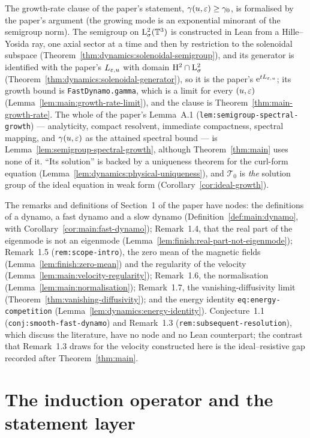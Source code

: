 The growth-rate clause of the paper's statement, $\gamma(u,\varepsilon)\geq\gamma_0$, is
formalised by the paper's argument (the growing mode is an exponential minorant of the
semigroup norm).  The semigroup on
$\mathrm{L}^2_\sigma(\mathbb{T}^3)$ is constructed in Lean from a Hille--Yosida ray, one axial sector at a
time and then by restriction to the solenoidal subspace
(Theorem~\ref{thm:dynamics:solenoidal-semigroup}), and its generator is identified with the
paper's $L_{\varepsilon,u}$ with domain $\mathrm{H}^2\cap\mathrm{L}^2_\sigma$
(Theorem~\ref{thm:dynamics:solenoidal-generator}), so it is the paper's $\mathrm{e}^{tL_{\varepsilon,u}}$; its
growth bound is \texttt{FastDynamo.gamma}, which is a limit for every $(u,\varepsilon)$
(Lemma~\ref{lem:main:growth-rate-limit}), and the clause is
Theorem~\ref{thm:main-growth-rate}.  The whole of the paper's Lemma~A.1
(\texttt{lem:semigroup-spectral-growth}) --- analyticity, compact resolvent, immediate
compactness, spectral mapping, and $\gamma(u,\varepsilon)$ as the attained spectral bound --- is
Lemma~\ref{lem:semigroup-spectral-growth}, although Theorem~\ref{thm:main} uses none of it.
``Its solution'' is backed by a uniqueness theorem for the curl-form equation
(Lemma~\ref{lem:dynamics:physical-uniqueness}), and $\mathcal T_0$ is \emph{the} solution group
of the ideal equation in weak form (Corollary~\ref{cor:ideal-growth}).

The remarks and definitions of Section~1 of the paper have nodes: the definitions of a
dynamo, a fast dynamo and a slow dynamo (Definition~\ref{def:main:dynamo}, with
Corollary~\ref{cor:main:fast-dynamo}); Remark~1.4, that the real part of the eigenmode is not
an eigenmode (Lemma~\ref{lem:finish:real-part-not-eigenmode}); Remark~1.5
(\texttt{rem:scope-intro}), the zero mean of the magnetic fields
(Lemma~\ref{lem:finish:zero-mean}) and the regularity of the velocity
(Lemma~\ref{lem:main:velocity-regularity}); Remark~1.6, the normalisation
(Lemma~\ref{lem:main:normalisation}); Remark~1.7, the vanishing-diffusivity limit
(Theorem~\ref{thm:vanishing-diffusivity}); and the energy identity
\texttt{eq:energy-competition} (Lemma~\ref{lem:dynamics:energy-identity}).  Conjecture~1.1
(\texttt{conj:smooth-fast-dynamo}) and Remark~1.3 (\texttt{rem:subsequent-resolution}), which
discuss the literature, have no node and no Lean counterpart; the contrast that Remark~1.3
draws for the velocity constructed here is the ideal--resistive gap recorded after
Theorem~\ref{thm:main}.

\section{The induction operator and the statement layer}


